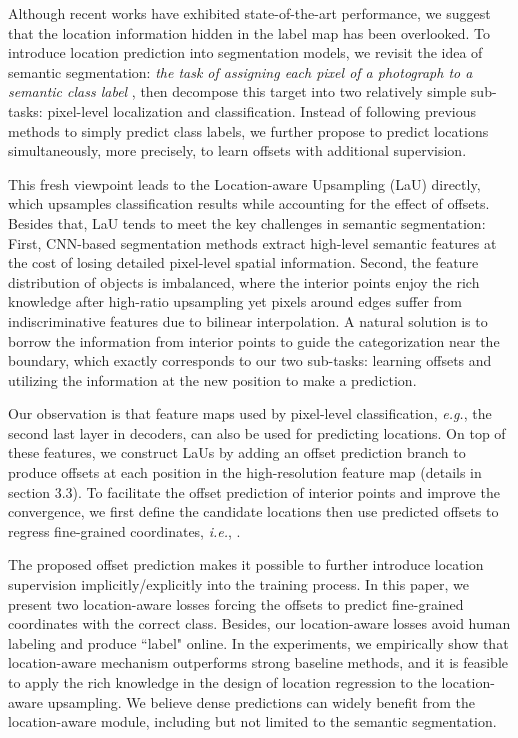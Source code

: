 \documentclass[10pt,twocolumn,letterpaper]{article}
\begin{document}
Although recent works have exhibited state-of-the-art performance, we suggest that the location information hidden in the label map has been overlooked. To introduce location prediction into segmentation models, we
revisit the idea of semantic segmentation: \textit{the task of assigning each pixel of a photograph to a semantic class label} \cite{LempitskyVZ11}, then decompose this target into two relatively simple sub-tasks: pixel-level localization and classification. Instead of following previous methods to simply predict class labels, we further propose to predict locations simultaneously, more precisely, to learn offsets with additional supervision. 

This fresh viewpoint leads to the Location-aware Upsampling (LaU) directly, which upsamples classification results while accounting for the effect of offsets. Besides that, LaU tends to meet the key challenges in semantic segmentation: First, CNN-based segmentation methods extract high-level semantic features at the cost of losing detailed pixel-level spatial information. Second, the feature distribution of objects is imbalanced, where the interior points enjoy the rich knowledge after high-ratio upsampling yet pixels around edges suffer from indiscriminative features due to bilinear interpolation. A natural solution is to borrow the information from interior points to guide the categorization near the boundary, which exactly corresponds to our two sub-tasks: learning offsets and utilizing the information at the new position to make a prediction.

Our observation is that feature maps used by pixel-level classification, \textit{e.g.}, the second last layer in decoders, can also be used for predicting locations. On top of these features, we construct LaUs by adding an offset prediction branch to produce offsets  at each position in the high-resolution feature map (details in section 3.3). To facilitate the offset prediction of interior points and improve the convergence, we first define the candidate locations  then use predicted offsets to regress fine-grained coordinates, \textit{i.e.}, . 

The proposed offset prediction makes it possible to further introduce location supervision implicitly/explicitly into the training process. In this paper, we present two location-aware losses forcing the offsets to predict fine-grained coordinates with the correct class. Besides, our location-aware losses avoid human labeling and produce ``label" online. In the experiments, we empirically show that location-aware mechanism outperforms strong baseline methods, and it is feasible to apply the rich knowledge in the design of location regression to the location-aware upsampling. We believe dense predictions can widely benefit from the location-aware module, including but not limited to the semantic segmentation.
\end{document}
